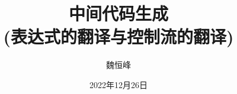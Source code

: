 \documentclass[]{beamer}
\title[语义分析]{中间代码生成 \\ (表达式的翻译与控制流的翻译)}
\author[魏恒峰]{\large 魏恒峰}
\institute{hfwei@nju.edu.cn}
\date{2022年12月26日}
\begin{document}
\maketitle

% 





\thankyou{}

\end{document}
